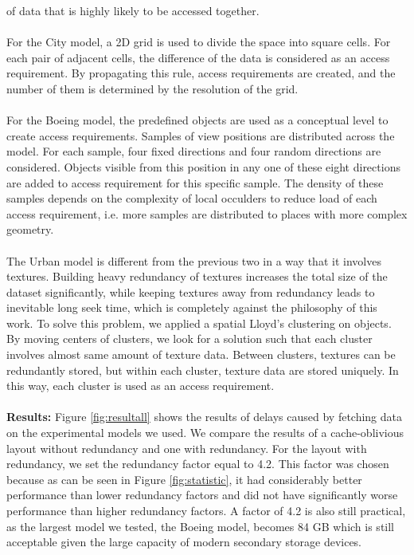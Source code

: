 of data that is highly likely to be accessed together. \\
\\
For the City model, a 2D grid is used to divide the space into square cells. For each pair of adjacent cells, the difference of the data is considered as an access requirement. By propagating this rule, access requirements are created, and the number of them is determined by the resolution of the grid.  \\
\\
For the Boeing model, the predefined objects are used as a conceptual level to create access requirements. Samples of view positions are distributed across the model. For each sample, four fixed directions and four random directions are considered. Objects visible from this position in any one of these eight directions are added to access requirement for this specific sample. The density of these samples depends on the complexity of local occulders to reduce load of each access requirement, i.e. more samples are distributed to places with more complex geometry. \\
\\
The Urban model is different from the previous two in a way that it involves textures. Building heavy redundancy of textures increases the total size of the dataset significantly, while keeping textures away from redundancy leads to inevitable long seek time, which is completely against the philosophy of this work. To solve this problem, we applied a spatial Lloyd’s clustering on objects. By moving centers of clusters, we look for a solution such that each cluster involves almost same amount of texture data. Between clusters, textures can be redundantly stored, but within each cluster, texture data are stored uniquely. In this way, each cluster is used as an access requirement.  \\
\\
\textbf{Results:}
Figure \ref{fig:resultall} shows the results of delays caused by fetching data on the experimental models we used. We compare the results of a cache-oblivious layout without redundancy and one with redundancy. For the layout with redundancy, we set the redundancy factor equal to 4.2. This factor was chosen because as can be seen in Figure \ref{fig:statistic}, it had considerably better performance than lower redundancy factors and did not have significantly worse performance than higher redundancy factors. A factor of 4.2 is also still practical, as the largest model we tested, the Boeing model, becomes 84 GB which is still acceptable given the large capacity of modern secondary storage devices.\\
